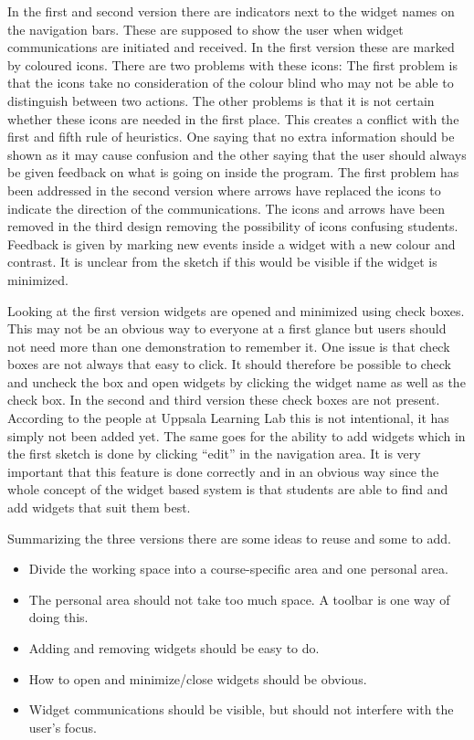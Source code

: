 In the first and second version there are indicators next to the widget names on the navigation bars. These are supposed to show the user when widget communications are initiated and received. In the first version these are marked by coloured icons. There are two problems with these icons: The first problem is that the icons take no consideration of the colour blind who may not be able to distinguish between two actions. The other problems is that it is not certain whether these icons are needed in the first place.  This creates a conflict with the first and fifth rule of heuristics. One saying that no extra information should be shown as it may cause confusion and the other saying that the user should always be given feedback on what is going on inside the program. The first problem has been addressed in the second version where arrows have replaced the icons to indicate the direction of the communications. The icons and arrows have been removed in the third design removing the possibility of icons confusing students. Feedback is given by marking new events inside a widget with a new colour and contrast. It is unclear from the sketch if this would be visible if the widget is minimized.

Looking at the first version widgets are opened and minimized using check boxes. This may not be an obvious way to everyone at a first glance but users should not need more than one demonstration to remember it. One issue is that check boxes are not always that easy to click. It should therefore be possible to check and uncheck the box and open widgets by clicking the widget name as well as the check box. In the second and third version these check boxes are not present. According to the people at Uppsala Learning Lab this is not intentional, it has simply not been added yet. The same goes for the ability to add widgets which in the first sketch is done by clicking “edit” in the navigation area. It is very important that this feature is done correctly and in an obvious way since the whole concept of the widget based system is that students are able to find and add widgets that suit them best.

Summarizing the three versions there are some ideas to reuse and some to add.
\begin {itemize}
	\item Divide the working space into a course-specific area and one personal area.
	\item The personal area should not take too much space. A toolbar is one way of doing this.
	\item Adding and removing widgets should be easy to do.
	\item How to open and minimize/close widgets should be obvious.
	\item Widget communications should be visible, but should not interfere with the user's focus.
\end {itemize}

